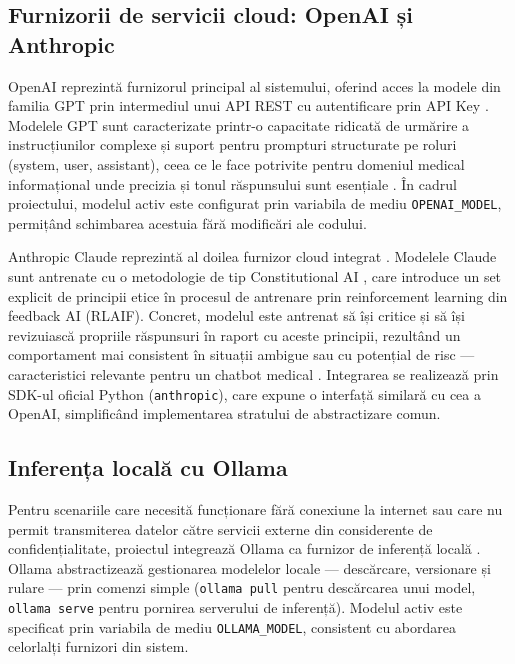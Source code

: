 \documentclass[12pt, a4paper, oneside, romanian]{teza-upb}
\begin{document}
\subsection{Furnizorii de servicii cloud: OpenAI și Anthropic}

OpenAI reprezintă furnizorul principal al sistemului, oferind acces la modele 
din familia GPT prin intermediul unui API REST cu autentificare prin API Key
\cite{openai_api}. Modelele GPT sunt caracterizate printr-o capacitate ridicată 
de urmărire a instrucțiunilor complexe și suport pentru prompturi structurate 
pe roluri (system, user, assistant), ceea ce le face potrivite pentru domeniul 
medical informațional unde precizia și tonul răspunsului sunt esențiale 
\cite{openai_api}. În cadrul proiectului, modelul activ este configurat prin 
variabila de mediu \texttt{OPENAI\_MODEL}, permițând schimbarea acestuia fără 
modificări ale codului.

Anthropic Claude reprezintă al doilea furnizor cloud integrat \cite{anthropic_claude}. 
Modelele Claude sunt antrenate cu o metodologie de tip Constitutional AI 
\cite{bai2022constitutional}, care introduce un set explicit de principii etice 
în procesul de antrenare prin reinforcement learning din feedback AI (RLAIF). 
Concret, modelul este antrenat să își critice și să își revizuiască propriile 
răspunsuri în raport cu aceste principii, rezultând un comportament mai 
consistent în situații ambigue sau cu potențial de risc — caracteristici 
relevante pentru un chatbot medical \cite{bai2022constitutional}. Integrarea 
se realizează prin SDK-ul oficial Python (\texttt{anthropic}), care expune 
o interfață similară cu cea a OpenAI, simplificând implementarea stratului 
de abstractizare comun.

\subsection{Inferența locală cu Ollama}

Pentru scenariile care necesită funcționare fără conexiune la internet sau care 
nu permit transmiterea datelor către servicii externe din considerente de 
confidențialitate, proiectul integrează Ollama ca furnizor de inferență locală 
\cite{ollama_doc}. Ollama abstractizează gestionarea modelelor locale — 
descărcare, versionare și rulare — prin comenzi simple (\texttt{ollama pull} 
pentru descărcarea unui model, \texttt{ollama serve} pentru pornirea serverului 
de inferență). Modelul activ este specificat prin variabila de mediu 
\texttt{OLLAMA\_MODEL}, consistent cu abordarea celorlalți furnizori din sistem.
\end{document}
